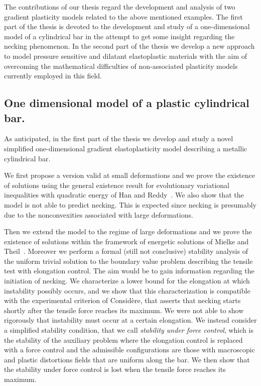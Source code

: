 \documentclass[a4paper,10pt,oneside]{amsbook}
\numberwithin{section}{chapter}
\numberwithin{equation}{chapter}
\theoremstyle{definition}
\begin{document}
The contributions of our thesis regard the development and analysis of two gradient plasticity models related to the above mentioned examples. The first part of the thesis is devoted to the development and study of a one-dimensional model of a cylindrical bar in the attempt to get some insight regarding the necking phenomenon. In the second part of the thesis we develop a new approach to model pressure sensitive and dilatant elastoplastic materials with the aim of overcoming the mathematical difficulties of non-associated plasticity models currently employed in this field.

\subsection*{One dimensional model of a plastic cylindrical bar.}

As anticipated, in the first part of the thesis we develop and study a novel simplified one-dimensional gradient elastoplasticity model describing a metallic cylindrical bar.

We first propose a version valid at small deformations and we prove the existence of solutions using the general existence result for evolutionary variational inequalities with quadratic energy of Han and Reddy~\cite{han-reddy}. We also show that the model is not able to predict necking. This is expected since necking is presumably due to the nonconvexities associated with large deformations.

Then we extend the model to the regime of large deformations and we prove the existence of solutions within the framework of energetic solutions of Mielke and Theil~\cite{francfort,rate-independent-systems}. Moreover we perform a formal (still not conclusive) stability analysis of the uniform trivial solution to the boundary value problem describing the tensile test with elongation control. The aim would be to gain information regarding the initiation of necking. We characterize a lower bound for the elongation at which instability possibly occurs, and we show that this characterization is compatible with the experimental criterion of Considère, that asserts that necking starts shortly after the tensile force reaches its maximum. We were not able to show rigorously that instability must occur at a certain elongation. We instead consider a simplified stability condition, that we call \emph{stability under force control}, which is the stability of the auxiliary problem where the elongation control is replaced with a force control and the admissible configurations are those with macroscopic and plastic distortions fields that are uniform along the bar. We then show that the stability under force control is lost when the tensile force reaches its maximum.
\end{document}
